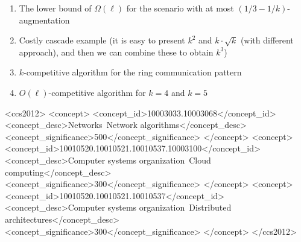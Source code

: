 \documentclass[manuscript,screen=true, review, anonymous]{acmart}
\begin{document}
\begin{enumerate}
  		 \item The lower bound of $\Omega(\ell)$ for the scenario with at most $(1/3-1/k)$-augmentation
  
  		 \item Costly cascade example (it is easy to present $k^2$ and $k\cdot \sqrt{k}$ (with different approach), and then we can combine these to obtain $k^3$)
  
  		 \item $k$-competitive algorithm for the ring communication pattern
  
  		 \item $O(\ell)$-competitive algorithm for $k=4$ and $k=5$
  
  \end{enumerate}



\begin{CCSXML}
	<ccs2012>
	<concept>
	<concept_id>10003033.10003068</concept_id>
	<concept_desc>Networks~Network algorithms</concept_desc>
	<concept_significance>500</concept_significance>
	</concept>
	<concept>
	<concept_id>10010520.10010521.10010537.10003100</concept_id>
	<concept_desc>Computer systems organization~Cloud computing</concept_desc>
	<concept_significance>300</concept_significance>
	</concept>
	<concept>
	<concept_id>10010520.10010521.10010537</concept_id>
	<concept_desc>Computer systems organization~Distributed architectures</concept_desc>
	<concept_significance>300</concept_significance>
	</concept>
	</ccs2012>
\end{CCSXML}
\end{document}
